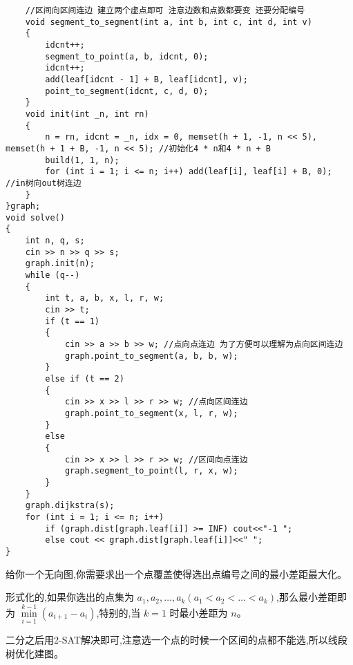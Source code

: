 \documentclass[a4paper, fontset=none]{ctexart}
\begin{document}
\begin{verbatim}
    //区间向区间连边 建立两个虚点即可 注意边数和点数都要变 还要分配编号
    void segment_to_segment(int a, int b, int c, int d, int v)
    {
        idcnt++;
        segment_to_point(a, b, idcnt, 0);
        idcnt++;
        add(leaf[idcnt - 1] + B, leaf[idcnt], v);
        point_to_segment(idcnt, c, d, 0);
    }
    void init(int _n, int rn)
    {
        n = rn, idcnt = _n, idx = 0, memset(h + 1, -1, n << 5), memset(h + 1 + B, -1, n << 5); //初始化4 * n和4 * n + B
        build(1, 1, n);
        for (int i = 1; i <= n; i++) add(leaf[i], leaf[i] + B, 0); //in树向out树连边
    }
}graph;
void solve()
{
    int n, q, s;
    cin >> n >> q >> s;
    graph.init(n);
    while (q--)
    {
        int t, a, b, x, l, r, w;
        cin >> t;
        if (t == 1)
        {
            cin >> a >> b >> w; //点向点连边 为了方便可以理解为点向区间连边
            graph.point_to_segment(a, b, b, w);
        }
        else if (t == 2)
        {
            cin >> x >> l >> r >> w; //点向区间连边
            graph.point_to_segment(x, l, r, w);
        }
        else
        {
            cin >> x >> l >> r >> w; //区间向点连边
            graph.segment_to_point(l, r, x, w);
        }
    }
    graph.dijkstra(s);
    for (int i = 1; i <= n; i++)
        if (graph.dist[graph.leaf[i]] >= INF) cout<<"-1 ";
        else cout << graph.dist[graph.leaf[i]]<<" ";
}
\end{verbatim}

给你一个无向图,你需要求出一个点覆盖使得选出点编号之间的最小差距最大化。

形式化的,如果你选出的点集为 $a_1, a_2,\dots, a_k (a_1 < a_2<\dots < a_k)$,那么最小差距即为 $\min \limits_{i=1}^{k-1}{(a_{i+1}-a_i)}$,特别的,当 $k=1$ 时最小差距为 $n$。

二分之后用2-SAT解决即可,注意选一个点的时候一个区间的点都不能选,所以线段树优化建图。
\end{document}
